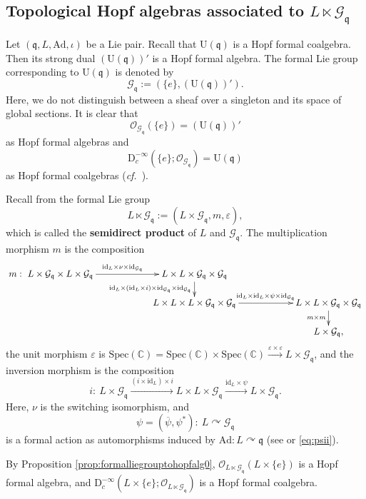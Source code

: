 \documentclass[12pt, a4paper]{amsart}
\newcommand{\BC}{{\mathbb {C}}}
\newcommand{\CG}{{\mathcal {G}}}
\newcommand{\CO}{{\mathcal {O}}}
\newcommand{\RD}{{\mathrm {D}}}
\newcommand{\RU}{{\mathrm {U}}}
\newcommand{\Ad}{{\mathrm{Ad}}}
\newcommand{\Spec}{{\mathrm{Spec}}}
\newcommand{\q}{\mathfrak q}
\newcommand{\be}{\begin {equation}}
\newcommand{\ee}{\end {equation}}
\newcommand{\cf}{\textit{cf.}~}
\theoremstyle{Theorem}
\theoremstyle{Theorem}
\theoremstyle{Theorem}
\theoremstyle{Theorem}
\theoremstyle{Plain}
\theoremstyle{remark}
\theoremstyle{remark}
\theoremstyle{Definition}
\numberwithin{equation}{section}
\begin{document}
\subsection{Topological Hopf algebras associated to $L\ltimes \CG_{\q}$}
 Let $(\q,L,\Ad,\iota)$ be a Lie pair. 
 Recall that  $\RU(\q)$ is a Hopf formal coalgebra. Then its strong dual $(\mathrm{U}(\mathfrak{q}))'$ is a  Hopf formal algebra. The formal Lie group corresponding to $\RU(\q)$ is denoted by \[\CG_{\mathfrak{q}}:=(\{e\},(\mathrm{U}(\mathfrak{q}))').\] Here, we do not distinguish between a sheaf over a singleton and its space of global sections. It is clear that 
  \[\CO_{\CG_{\q}}(\{e\})=(\RU(\q))'\] as Hopf formal algebras and 
  \[\RD^{-\infty}_c(\{e\};\CO_{\CG_{\q}})=\RU(\q)\] as Hopf formal coalgebras 
  (\cf  \cite[Example 2.9]{CSW4}). 
 
 Recall from \cite[Section 6.1]{CSW4} the formal Lie group
\[L\ltimes \CG_{\q}:=(L\times \CG_{\q},m, \varepsilon),\] which is called the \textbf{semidirect product} of $L$ and $\CG_{\q}$. 
The multiplication morphism $m$ is the composition \be\label{eq:mGltimesH}\xymatrix@R-0.7pc@C+2.9pc{m:\ L\times \CG_{\q} \times L\times \CG_\q \ar[r]^{\mathrm{id}_L\times \nu \times \mathrm{id}_{\CG_{\q}}}&L\times L \times \CG_{\q} \times \CG_{\q} \ar[d]_{\mathrm{id}_L\times(\mathrm{id}_L\times i)\times \mathrm{id}_{\CG_{\q}} \times \mathrm{id}_{\CG_{\q}}}\\&L\times L\times L\times \CG_{\q} \times \CG_{\q}\ar[r]^-{\mathrm{id}_L\times \mathrm{id}_{L}\times\psi \times \mathrm{id}_{\CG_{\q}}}&L\times L\times \CG_{\q}\times \CG_{\q}\ar[d]_{m\times m}\\&&L\times \CG_{\q}, }\ee
the unit morphism $\varepsilon$ 
is  
$\Spec(\BC)=\Spec (\BC)\times \Spec(\BC)\xrightarrow{\varepsilon\times \varepsilon} L\times \CG_{\q} $, and the inversion morphism is the composition \be \label{eq:iGH} i:\ L\times \CG_{\q} \xrightarrow {(i\times\mathrm{id}_{L})\times i }L\times L \times \CG_{\q} \xrightarrow{\mathrm{id}_{L}\times \psi} L\times \CG_{\q}.\ee
Here,  $\nu$ is the switching isomorphism, and \be\label{eq:psiofLonLq} \psi=(\overline{\psi},\psi^*):\  L\curvearrowright \CG_{\q}\ee is a formal action 
as automorphisms induced by $\Ad: L\curvearrowright \q$ (see \cite[Proposition 8.1]{CSW4} or \eqref{eq:psii}).

By Proposition \ref{prop:formalliegrouptohopfalg0},  $\CO_{L\ltimes \CG_{\q}}(L\times \{e\})$ is a Hopf formal  algebra, and $\RD^{-\infty}_c(L\times \{e\};\CO_{L\ltimes \CG_{\q}})$ is a Hopf formal coalgebra. 
\end{document}
